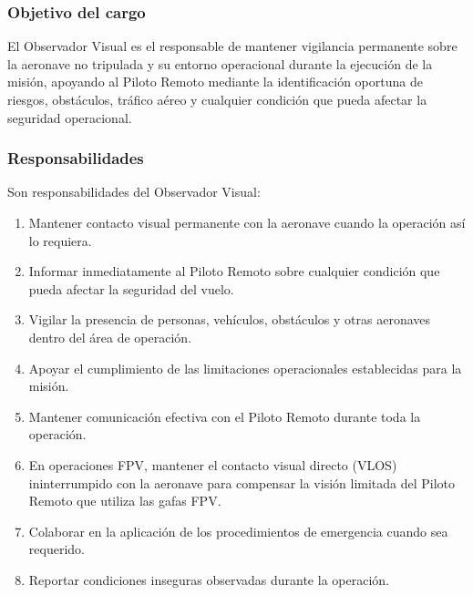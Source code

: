 \subsubsection*{Objetivo del cargo}

El Observador Visual es el responsable de mantener vigilancia permanente sobre la aeronave no tripulada y su entorno operacional durante la ejecución de la misión, apoyando al Piloto Remoto mediante la identificación oportuna de riesgos, obstáculos, tráfico aéreo y cualquier condición que pueda afectar la seguridad operacional.

\subsubsection*{Responsabilidades}

Son responsabilidades del Observador Visual:

\begin{enumerate}[label=\alph*)]

\item Mantener contacto visual permanente con la aeronave cuando la operación así lo requiera.

\item Informar inmediatamente al Piloto Remoto sobre cualquier condición que pueda afectar la seguridad del vuelo.

\item Vigilar la presencia de personas, vehículos, obstáculos y otras aeronaves dentro del área de operación.

\item Apoyar el cumplimiento de las limitaciones operacionales establecidas para la misión.

\item Mantener comunicación efectiva con el Piloto Remoto durante toda la operación.

\item En operaciones FPV, mantener el contacto visual directo (VLOS) ininterrumpido con la aeronave para compensar la visión limitada del Piloto Remoto que utiliza las gafas FPV.

\item Colaborar en la aplicación de los procedimientos de emergencia cuando sea requerido.

\item Reportar condiciones inseguras observadas durante la operación.

\end{enumerate}

